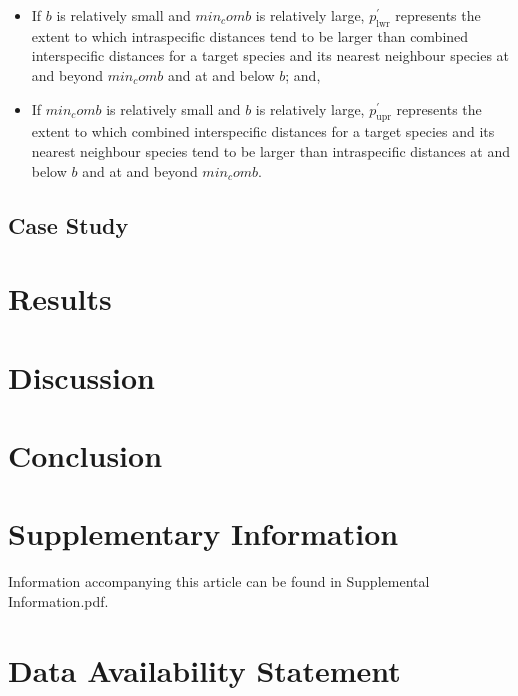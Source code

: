 \documentclass[12pt]{article}
\begin{document}
\begin{itemize}
\begin{itemize}
\vspace{1mm}

\item If $b$ is relatively small and $min_comb$ is relatively large, $p^{'}_\mathrm{lwr}$ represents the extent to which intraspecific distances tend to be larger than combined interspecific distances for a target species and its nearest neighbour species at and beyond $min_comb$ and at and below $b$; and,

\vspace{1mm}

\item If $min_comb$ is relatively small and $b$ is relatively large, $p^{'}_\mathrm{upr}$ represents the extent to which combined interspecific distances for a target species and its nearest neighbour species tend to be larger than intraspecific distances at and below $b$ and at and beyond $min_comb$.


\end{itemize}

\end{itemize}

\subsection{Case Study}

\section{Results}

\section{Discussion}

\section{Conclusion}


\newpage

\section*{Supplementary Information}

Information accompanying this article can be found in Supplemental Information.pdf.

\section*{Data Availability Statement}
\end{document}
